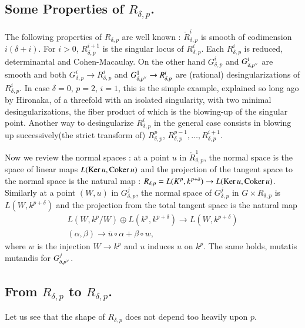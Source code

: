 \subsection{Some Properties of \texorpdfstring{$R_{\delta,p}$}{Rdp}.}\label{chap6-sec2.2}

The following properties of $R_{\delta,p}$ are well known :
$\ring{R}^{i}_{\delta,p}$ is smooth of codimension $i(\delta+i)$. For
$i>0$, $R^{i+1}_{\delta,p}$ is the singular locus of
$R^{i}_{\delta,p}$. Each $R^{i}_{\delta,p}$ is reduced, determinantal
and Cohen-Macaulay. On the other hand $G^{i}_{\delta,p}$ and
$G^{i}_{\delta,p\spcheck}$ are smooth and both $G^{i}_{\delta,p}\to
R^{i}_{\delta,p}$ and $G^{1}_{\delta,p\spcheck}\to R^{i}_{\delta,p}$
are (rational) desingularizations of $R^{i}_{\delta,p}$. In case
$\delta=0$, $p=2$, $i=1$, this is the simple example, explained so
long ago by Hironaka, of a threefold with an isolated singularity,
with two minimal desingularizations, the fiber product of which is the
blowing-up of the singular point. Another way to desingularize
$R^{i}_{\delta,p}$ in the general case consists in blowing up
successively\pageoriginale (the strict transform of)
$R^{p}_{\delta,p}$, $R^{p-1}_{\delta,p},\ldots,R^{i+1}_{\delta,p}$. 

Now we review the normal spaces : at a point $u$ in
$\ring{R}^{1}_{\delta,p}$, the normal space is the space of linear
maps $L(\operatorname{Ker} u,\operatorname{Coker} u)$ and the projection of the tangent space to
the normal space is the natural map :
$R_{\delta,p}=L(K^{p},k^{p+\delta})\to L(\operatorname{Ker} u,\operatorname{Coker} u)$. Similarly
at a point $(W,u)$ in $G^{j}_{\delta,p}$, the normal space of
$G^{j}_{\delta,p}$ in $G\times R_{\delta,p}$ is $L(W,k^{p+\delta})$
and the projection from the total tangent space is the natural map
\begin{gather*}
L(W,k^{p}/W)\oplus L(k^{p},k^{p+\delta})\to L(W,k^{p+\delta})\\
(\alpha,\beta)\to \overline{u}\circ \alpha+\beta \circ w,
\end{gather*}
where $w$ is the injection $W\to k^{p}$ and $u$ induces $u$ on
$k^{p}$. The same holds, mutatis mutandis for
$G^{j}_{\delta,p\spcheck}$. 

\subsection{From \texorpdfstring{$R_{\delta,p}$}{Rdp} to
\texorpdfstring{$R_{\delta,p}$}{Rdp}.}\label{chap6-sec2.3}

Let us see that the shape of $R_{\delta,p}$ does not depend too
heavily upon $p$.


